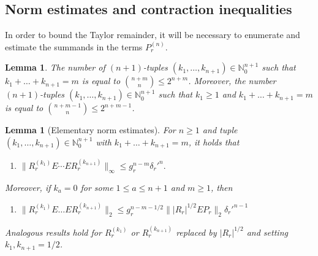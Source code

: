 \documentclass[a4paper,11pt]{article} %
\numberwithin{equation}{section}
\theoremstyle{definition}
\theoremstyle{remark}
\theoremstyle{plain}
\newtheorem{lemma}[definition]{Lemma}
\begin{document}

\subsection{Norm estimates and contraction inequalities}%
\label{ssec_NormEstimatesAndContractionInequalities}

In order to bound the Taylor remainder, it will be necessary to enumerate and estimate the summands in the terms \( P_{r}^{ ( n ) } \).

\begin{lemma}%
  \label{lem_NumberOfTuples}
  The number of \( ( n + 1 ) \)-tuples 
  \( ( k_{1},  \dots,  k_{n + 1} ) \in \mathbb{N}_{0}^{ n + 1 } \) such that
  \( k_{1} + \dots + k_{ n + 1 } = m \) is equal to 
  \( \binom{n + m}{n} \le 2^{ n + m } \). Moreover, the number \( ( n + 1 ) \)-tuples 
  \( ( k_{1},  \dots,  k_{n + 1} ) \in \mathbb{N}_{0}^{ n + 1 } \) such that \(k_1\geq 1\) and
  \( k_{1} + \dots + k_{ n + 1 } = m \) is equal to 
  \( \binom{n + m -1}{n} \le 2^{ n + m - 1} \).  
\end{lemma}%

\begin{lemma}[Elementary norm estimates]%
  \label{lem_ElementaryNormEstimates}
  For \( n \ge 1 \) and tuple \( (k_{1}, \dots, k_{n + 1}) \in \mathbb{N}_{0}^{n + 1} \) with \( k_{1} + \dots + k_{n + 1} = m \), it holds that
  \begin{enumerate}
    \item[(i)]
      \( 
          \| R_{r}^{ (k_{1}) } E \cdots E R_{r}^{ (k_{n + 1}) } \|_{ \infty } 
      \le g_{r}^{n - m} \delta_{r}'^{n}.
      \) 
  \end{enumerate}
  Moreover, if \( k_{a} = 0 \) for some \( 1 \le a \le n + 1 \) and \( m \ge 1 \), then 
  \begin{enumerate}[label=(\roman*)]
    \item[(ii)]
      \( 
            \| R_{r}^{ ( k_{1} ) } E \dots E R_{r}^{ ( k_{n + 1} ) } \|_{2}
        \le g_{r}^{ n - m - 1 / 2 } \| | R_{r} |^{1/2} E P_{r} \|_{2}
            \delta_{r}'^{n - 1}
      \)
  \end{enumerate}
  Analogous results hold for \( R_{r}^{ ( k_{1} ) } \) or \( R_{r}^{ ( k_{ n + 1 }) } \) replaced by \( | R_{r} |^{1/2} \) and setting \( k_{1}, k_{n + 1} = 1/2 \).
\end{lemma}%
\end{document}
